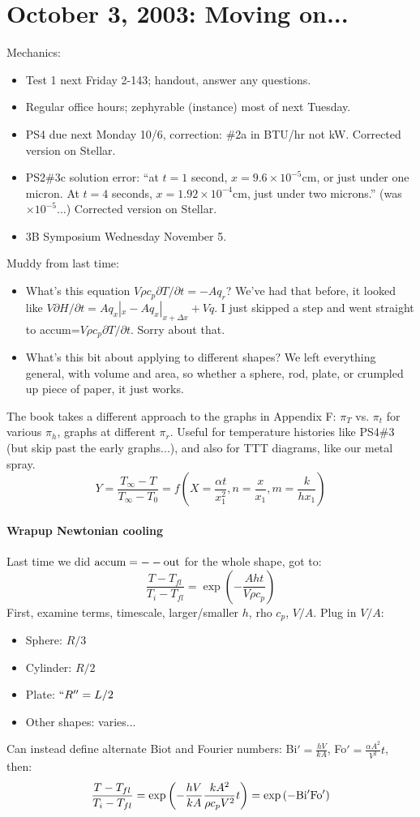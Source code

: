 \documentclass{report}
\begin{document}
\section{October 3, 2003: Moving on...}

Mechanics:
\begin{itemize}
\item Test 1 next Friday 2-143; handout, answer any questions.
\item Regular office hours; zephyrable (instance) most of next Tuesday.
\item PS4 due next Monday 10/6, correction: \#2a in BTU/hr not kW.  Corrected
  version on Stellar.
\item PS2\#3c solution error: ``at $t=1$ second, $x=9.6\times10^{-5}$cm, or
  just under one micron.  At $t=4$ seconds, $x=1.92\times10^{-4}$cm, just under
  two microns.'' (was $\times10^{-5}$...)  Corrected version on Stellar.
\item 3B Symposium Wednesday November 5.
\end{itemize}

\noindent Muddy from last time:
\begin{itemize}
\item What's this equation $V\rho c_p\partial T/\partial t = -Aq_r$?  We've had
  that before, it looked like $V\partial H/\partial t = Aq_x|_x -
  Aq_x|_{x+\Delta x} + V\dot{q}$.  I just skipped a step and went straight to
  accum=$V\rho c_p\partial T/\partial t$.  Sorry about that.
\item What's this bit about applying to different shapes?  We left everything
  general, with volume and area, so whether a sphere, rod, plate, or crumpled
  up piece of paper, it just works.
\end{itemize}

The book takes a different approach to the graphs in Appendix F: $\pi_T$ vs.
$\pi_t$ for various $\pi_h$, graphs at different $\pi_r$.  Useful for
temperature histories like PS4\#3 (but skip past the early graphs...), and also
for TTT diagrams, like our metal spray.
$$Y=\frac{T_\infty-T}{T_\infty-T_0} = f\left(X=\frac{\alpha t}{x_1^2},
  n=\frac{x}{x_1}, m=\frac{k}{hx_1}\right)$$

\paragraph{Wrapup Newtonian cooling}

Last time we did $\rm accum = --out$ for the whole shape, got to:
$$\frac{T-T_{fl}}{T_i-T_{fl}} = \exp\left(-\frac{A h t}{V\rho c_p}\right)$$
First, examine terms, timescale, larger/smaller $h$, rho $c_p$, $V/A$.  Plug in
$V/A$:
\begin{itemize}
\item Sphere: $R/3$
\item Cylinder: $R/2$
\item Plate: $``R'' = L/2$
\item Other shapes: varies...
\end{itemize}
Can instead define alternate Biot and Fourier numbers: Bi$'=\frac{hV}{kA}$,
Fo$'=\frac{\alpha A^2}{V^2}t$, then:
$$\frac{T-T_{fl}}{T_i-T_{fl}} = \exp\left(-\frac{hV}{kA}\frac{kA^2}{\rho
    c_pV^2}t\right) = \exp\left(\rm -Bi'Fo'\right)$$
\end{document}
